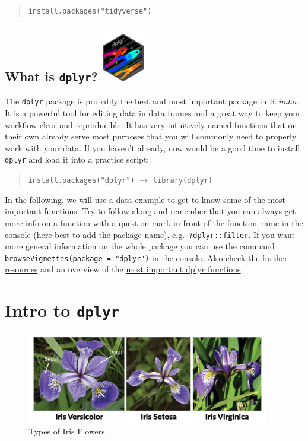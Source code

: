 \documentclass[
]{book}
\begin{document}
\begin{quote}
\texttt{install.packages("tidyverse")}
\end{quote}

\subsection[What is \texttt{dplyr}? ]{\texorpdfstring{What is \texttt{dplyr}? \protect\includegraphics[width=\textwidth,height=0.83333in]{./img/dplyr.png}}{What is dplyr? dplyr logo}}\label{what-is-dplyr-dplyr-logo}

The \texttt{dplyr} package is probably the best and most important package in R \emph{imho}.
It is a powerful tool for editing data in data frames and a great way to keep your workflow clear and reproducible.
It has very intuitively named functions that on their own already serve most purposes that you will commonly need to properly work with your data.
If you haven't already, now would be a good time to install \texttt{dplyr} and load it into a practice script:

\begin{quote}
\texttt{install.packages("dplyr")} \(\rightarrow\) \texttt{library(dplyr)}
\end{quote}

In the following, we will use a data example to get to know some of the most important functions.
Try to follow along and remember that you can always get more info on a function with a question mark in front of the function name in the console (here best to add the package name), e.g.~\texttt{?dplyr::filter}.
If you want more general information on the whole package you can use the command \texttt{browseVignettes(package\ =\ "dplyr")} in the console.
Also check the \hyperref[wrapupdplyr]{further resources} and an overview of the \hyperref[mif]{most important dplyr functions}.

\section{\texorpdfstring{Intro to \texttt{dplyr}}{Intro to dplyr}}\label{intro-iris}

\begin{figure}
\centering
\includegraphics[width=\textwidth,height=1.5625in]{./img/iris-setosa.png}
\caption{Types of Iris Flowers}
\end{figure}
\end{document}
